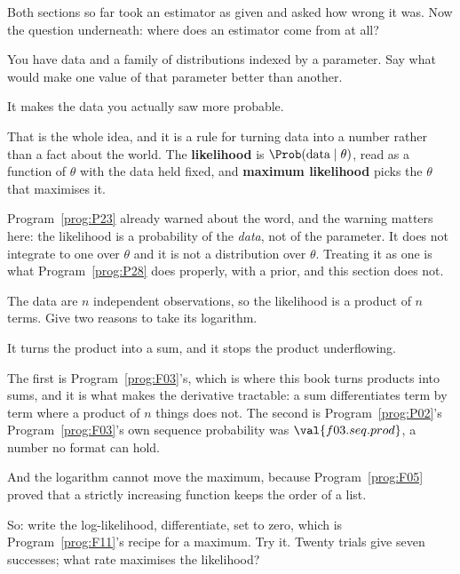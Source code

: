 \begin{fr}
Both sections so far took an estimator as given and asked how wrong it was.
Now the question underneath: where does an estimator come from at all?

You have data and a family of distributions indexed by a parameter. Say what
would make one value of that parameter better than another.
\dotline
\nextframe
\end{fr}

\begin{fr}
\begin{ansblock}
It makes the data you actually saw more probable.
\end{ansblock}

That is the whole idea, and it is a rule for turning data into a number
rather than a fact about the world. The \textbf{likelihood} is
$\Prob(\text{data} \mid \theta)$, read as a function of $\theta$ with the
data held fixed, and \textbf{maximum likelihood} picks the $\theta$ that
maximises it.

Program~\ref{prog:P23} already warned about the word, and the warning
matters here: the likelihood is a probability of the \emph{data}, not of the
parameter. It does not integrate to one over $\theta$ and it is not a
distribution over $\theta$. Treating it as one is what
Program~\ref{prog:P28} does properly, with a prior, and this section does
not.

The data are $n$ independent observations, so the likelihood is a product of
$n$ terms. Give two reasons to take its logarithm.
\dotline
\nextframe
\end{fr}

\begin{fr}
\begin{ansblock}
It turns the product into a sum, and it stops the product underflowing.
\end{ansblock}

The first is Program~\ref{prog:F03}'s, which is where this book turns
products into sums, and it is what makes the derivative tractable: a sum
differentiates term by term where a product of $n$ things does not. The
second is Program~\ref{prog:P02}'s \dash{} Program~\ref{prog:F03}'s own
sequence probability was $\val{f03.seq.prod}$, a number no format can hold.

And the logarithm cannot move the maximum, because
Program~\ref{prog:F05} proved that a strictly increasing function keeps the
order of a list.

So: write the log-likelihood, differentiate, set to zero, which is
Program~\ref{prog:F11}'s recipe for a maximum. Try it. Twenty trials give
seven successes; what rate maximises the likelihood?
\dotline
\nextframe
\end{fr}


